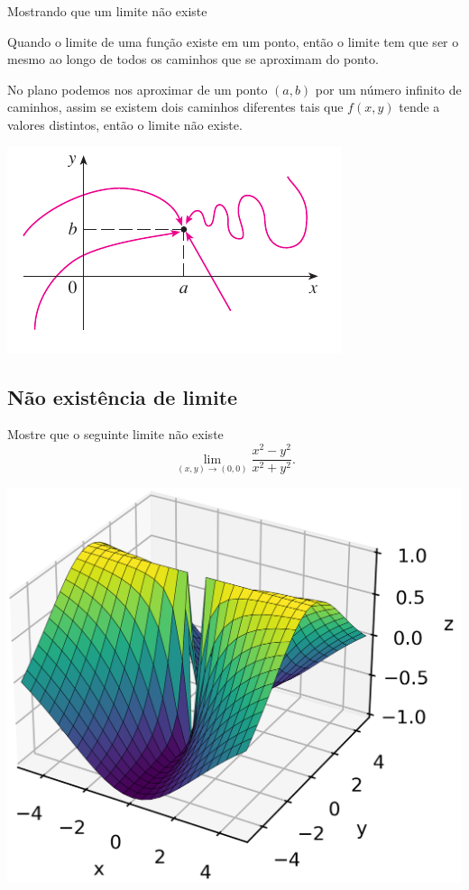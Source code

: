 \begin{frame}[label=limites]{Mostrando que um limite não existe}

Quando o limite de uma função existe em um ponto, então o limite tem que ser o mesmo ao longo de todos os caminhos que se aproximam do ponto. 
\smallskip 

No plano podemos nos aproximar de um ponto {\color{blue}$(a,b)$} por {\color{red} um número infinito de caminhos}, assim se existem dois caminhos diferentes tais que $f(x,y)$ tende a valores distintos, então o limite não existe.


\begin{center}
	\includegraphics[scale=0.5]{figuras/lim-caminhos.png}
\end{center}

		
\end{frame}

\subsection*{Não existência de limite}
\begin{frame}[label=limites]
	\begin{exe} Mostre que o seguinte limite não existe
		\[\lim_{(x,y)\to(0,0)}\frac{x^2-y^2}{x^2+y^2}.\]
	\end{exe}  

	\begin{center}
		\includegraphics[scale=0.7]{figuras/lim1.png}
	\end{center}

\end{frame}

